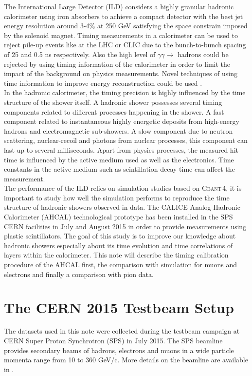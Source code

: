 \documentclass[twoside,a4paper,11pt]{article}
\newcommand\geant{\textsc{Geant\,4}\xspace}
\begin{document}
The International Large Detector (ILD) \cite{ILC_TDR} considers a highly granular hadronic calorimeter using iron absorbers to achieve a compact detector with the best jet energy resolution around 3-4\% at 250 GeV satisfying the space constrain imposed by the solenoid magnet. Timing measurements in a calorimeter can be used to reject pile-up events like at the LHC or CLIC due to the bunch-to-bunch spacing of 25 and 0.5 ns respectively. Also the high level of $\gamma\gamma \rightarrow$ hadrons could be rejected by using timing information of the calorimeter in order to limit the impact of the background on physics measurements. Novel techniques of using time information to improve energy reconstruction could be used \cite{IEEE_timing}.\\
In the hadronic calorimeter, the timing precision is highly influenced by the time structure of the shower itself. A hadronic shower possesses several timing components related to different processes happening in the shower. A fast component related to instantaneous highly energetic deposits from high-energy hadrons and electromagnetic sub-showers. A slow component due to neutron scattering, nuclear-recoil and photons from nuclear processes, this component can last up to several milliseconds. Apart from physics processes, the measured hit time is influenced by the active medium used as well as the electronics. Time constants in the active medium such as scintillation decay time can affect the measurement.\\
The performance of the ILD relies on simulation studies based on \geant, it is important to study how well the simulation performs to reproduce the time structure of hadronic showers observed in data. The CALICE Analog Hadronic Calorimeter (AHCAL) technological prototype has been installed in the SPS CERN facilities in July and August 2015 in order to provide measurements using plastic scintillators. The goal of this study is to improve our knowledge about hadronic showers especially about its time evolution and time correlations of layers within the calorimeter. This note will describe the timing calibration procedure of the AHCAL first, the comparison with simulation for muons and electrons and finally a comparison with pion data.

\section{The CERN 2015 Testbeam Setup}

The datasets used in this note were collected during the testbeam campaign at CERN Super Proton Synchrotron (SPS) in July 2015. The SPS beamline provides secondary beams of hadrons, electrons and muons in a wide particle momenta range from 10 to 360 GeV/c. More details on the beamline are available in \cite{SPSBeamLine}.
\end{document}
